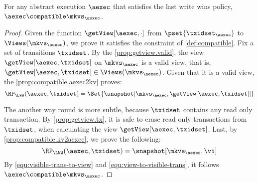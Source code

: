 \begin{theorem}
\label{thm:aexec2kv.compatible}
For any abstract execution \(\aexec\) that satisfies the last write wins policy, \(\aexec \compatible \mkvs_{\aexec}\).
\end{theorem}
\begin{proof}
Given the function \(\getView[\aexec, \cdot]\) from \(\pset{\txidset_{\aexec}}\) to \(\Views(\mkvs_{\aexec})\),
we prove it satisfies the constraint of \cref{def:compatible}.
Fix a set of transitions \( \txidset \).
By the \cref{prop:getview.valid}, the view \(\getView[\aexec, \txidset]\)  on \( \mkvs_\aexec \) is a valid view,
that is, \( \getView[\aexec, \txidset] \in \Views(\mkvs_\aexec) \).
Given that it is a valid view, the \cref{prop:compatible.aexec2kv} proves:
\begin{equation}
    \label{equ:visible-trans-to-view}
    \RP_{\LWW}(\aexec, \txidset) = \Set{\snapshot[\mkvs_{\aexec}, \getView[\aexec, \txidset]]} 
\end{equation}

The another way round is more subtle,
because \( \txidset \) contains any read only transaction.
By \cref{prop:getview.tx}, it is safe to erase read only transactions from \( \txidset \),
when calculating the view \( \getView[\aexec, \txidset] \).
Last, by \cref{prop:compatible.kv2aexec}, we prove the following:
\begin{equation}
    \label{equ:view-to-visible-trans}
    \RP_{\LWW}(\aexec, \txidset) = \snapshot[\mkvs_{\aexec}, \vi]
\end{equation}
By \cref{equ:visible-trans-to-view} and \cref{equ:view-to-visible-trans},
it follows \( \aexec \compatible \mkvs_{\aexec} \).
\end{proof}

